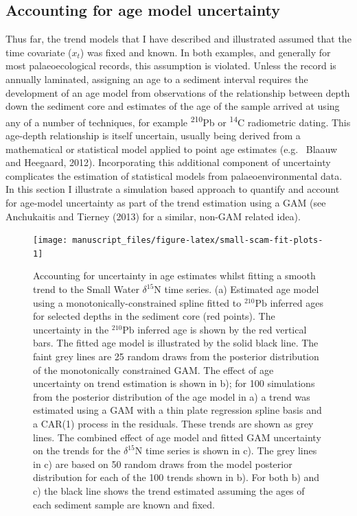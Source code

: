 \documentclass[12pt,]{article}
\begin{document}
\subsection{Accounting for age model
uncertainty}\label{accounting-for-age-model-uncertainty}

Thus far, the trend models that I have described and illustrated assumed
that the time covariate (\(x_t\)) was fixed and known. In both examples,
and generally for most palaeoecological records, this assumption is
violated. Unless the record is annually laminated, assigning an age to a
sediment interval requires the development of an age model from
observations of the relationship between depth down the sediment core
and estimates of the age of the sample arrived at using any of a number
of techniques, for example \textsuperscript{210}Pb or
\textsuperscript{14}C radiometric dating. This age-depth relationship is
itself uncertain, usually being derived from a mathematical or
statistical model applied to point age estimates (e.g.~ Blaauw and
Heegaard, 2012). Incorporating this additional component of uncertainty
complicates the estimation of statistical models from
palaeoenvironmental data. In this section I illustrate a simulation
based approach to quantify and account for age-model uncertainty as part
of the trend estimation using a GAM (see Anchukaitis and Tierney (2013)
for a similar, non-GAM related idea).

\begin{figure}

{\centering \texttt{[image: manuscript\_files/figure-latex/small-scam-fit-plots-1]} 

}

\caption{Accounting for uncertainty in age estimates whilst fitting a smooth trend to the Small Water $\delta^{15}\text{N}$ time series. (a) Estimated age model using a monotonically-constrained spline fitted to ${}^{210}\text{Pb}$ inferred ages for selected depths in the sediment core (red points). The uncertainty in the ${}^{210}\text{Pb}$ inferred age is shown by the red vertical bars. The fitted age model is illustrated by the solid black line. The faint grey lines are 25 random draws from the posterior distribution of the monotonically constrained GAM. The effect of age uncertainty on trend estimation is shown in b); for 100 simulations from the posterior distribution of the age model in a) a trend was estimated using a GAM with a thin plate regression spline basis and a CAR(1) process in the residuals. These trends are shown as grey lines. The combined effect of age model and fitted GAM uncertainty on the trends for the $\delta^{15}\text{N}$ time series is shown in c). The grey lines in c) are based on 50 random draws from the model posterior distribution for each of the 100 trends shown in b). For both b) and c) the black line shows the trend estimated assuming the ages of each sediment sample are known and fixed.}\label{fig:small-scam-fit-plots}
\end{figure}
\end{document}
